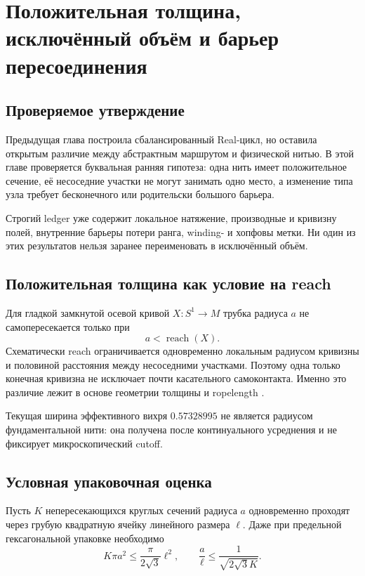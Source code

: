 \chapter{Положительная толщина, исключённый объём и барьер пересоединения}
\label{ch:v6-single-thread-excluded-volume-reconnection-barrier-gate}

\section{Проверяемое утверждение}

Предыдущая глава построила сбалансированный Real-цикл, но оставила
открытым различие между абстрактным маршрутом и физической нитью. В этой
главе проверяется буквальная ранняя гипотеза: одна нить имеет положительное
сечение, её несоседние участки не могут занимать одно место, а изменение
типа узла требует бесконечного или родительски большого барьера.

Строгий ledger уже содержит локальное натяжение, производные и кривизну
полей, внутренние барьеры потери ранга, winding- и хопфовы метки. Ни один
из этих результатов нельзя заранее переименовать в исключённый объём.

\section{Положительная толщина как условие на reach}

Для гладкой замкнутой осевой кривой $X:S^1\to M$ трубка радиуса $a$ не
самопересекается только при
\begin{equation}
 a<\operatorname{reach}(X).
\end{equation}
Схематически reach ограничивается одновременно локальным радиусом
кривизны и половиной расстояния между несоседними участками. Поэтому одна
только конечная кривизна не исключает почти касательного самоконтакта.
Именно это различие лежит в основе геометрии толщины и ropelength
\cite{single-thread-gonzalez-maddocks1999,
single-thread-cantarella-fu-kusner-sullivan2014}.

Текущая ширина эффективного вихря $0.57328995$ не является радиусом
фундаментальной нити: она получена после континуального усреднения и не
фиксирует микроскопический cutoff.

\section{Условная упаковочная оценка}

Пусть $K$ непересекающихся круглых сечений радиуса $a$ одновременно
проходят через грубую квадратную ячейку линейного размера $\ell$. Даже
при предельной гексагональной упаковке необходимо
\begin{equation}
 K\pi a^2\leq \frac{\pi}{2\sqrt3}\ell^2,
 \qquad
 \frac a\ell\leq\frac{1}{\sqrt{2\sqrt3K}}.
 \label{eq:v6-single-thread-packing-bound}
\end{equation}


